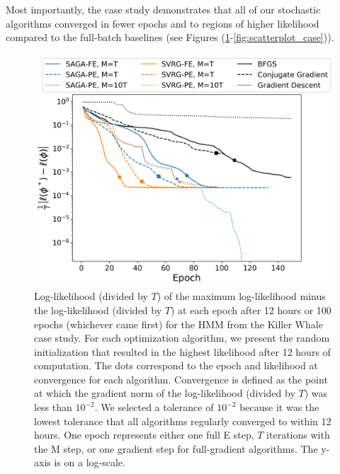 Most importantly, the case study demonstrates that all of our stochastic algorithms converged in fewer epochs and to regions of higher likelihood compared to the full-batch baselines (see Figures (\ref{fig:ll_trace_case}-\ref{fig:scatterplot_case})).
%
\begin{figure}
    \centering
    \includegraphics[width=6.5in]{../plt/log-like_v_epoch_K-3-3.png}
    \caption{Log-likelihood (divided by $T$) of the maximum log-likelihood minus the log-likelihood (divided by $T$) at each epoch after 12 hours or 100 epochs (whichever came first) for the HMM from the Killer Whale case study. For each optimization algorithm, we present the random initialization that resulted in the highest likelihood after 12 hours of computation. The dots correspond to the epoch and likelihood at convergence for each algorithm. Convergence is defined as the point at which the gradient norm of the log-likelihood (divided by $T$) was less than $10^{-2}$. We selected a tolerance of $10^{-2}$ because it was the lowest tolerance that all algorithms regularly converged to within 12 hours. One epoch represents either one full E step, $T$ iterations with the M step, or one gradient step for full-gradient algorithms. The y-axis is on a log-scale.}
    \label{fig:ll_trace_case}
\end{figure}
%
